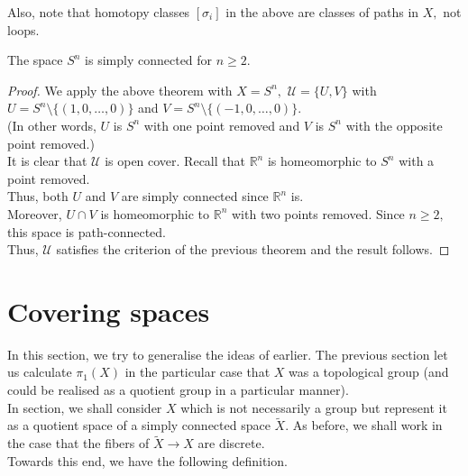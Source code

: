 \documentclass[12pt]{article}
\begin{document}
Also, note that homotopy classes $[\sigma_i]$ in the above are classes of paths in $X,$ not loops. 
\begin{prop} \label{prop:Snsimplyconnected}
	The space $S^n$ is simply connected for $n \ge 2.$
\end{prop}
\begin{proof} 
	We apply the above theorem with $X = S^n,$ $\mathcal{U} = \{U, V\}$ with $U = S^n\setminus\{(1, 0, \ldots, 0)\}$ and $V = S^n\setminus\{(-1, 0, \ldots, 0)\}.$\\
	(In other words, $U$ is $S^n$ with one point removed and $V$ is $S^n$ with the opposite point removed.)\\
	It is clear that $\mathcal{U}$ is open cover. Recall that $\mathbb{R}^n$ is homeomorphic to $S^n$ with a point removed.\\
	Thus, both $U$ and $V$ are simply connected since $\mathbb{R}^n$ is.\\
	Moreover, $U \cap V$ is homeomorphic to $\mathbb{R}^n$ with two points removed. Since $n \ge 2,$ this space is path-connected.\\
	Thus, $\mathcal{U}$ satisfies the criterion of the previous theorem and the result follows.
\end{proof}
%
\section{Covering spaces}
%
In this section, we try to generalise the ideas of earlier. The previous section let us calculate $\pi_1(X)$ in the particular case that $X$ was a topological group (and could be realised as a quotient group in a particular manner).\\
In section, we shall consider $X$ which is not necessarily a group but represent it as a quotient space of a simply connected space $\tilde{X}.$ As before, we shall work in the case that the fibers of $\tilde{X} \to X$ are discrete.\\
Towards this end, we have the following definition.
\end{document}

